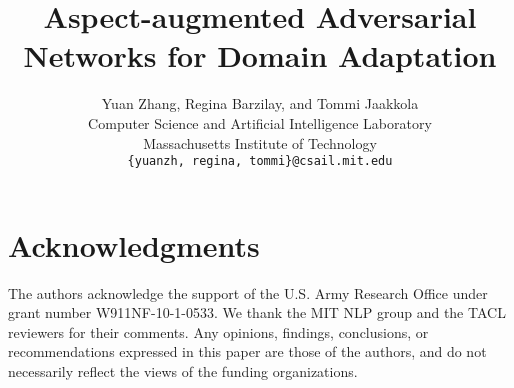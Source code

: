 \documentclass[11pt,letterpaper]{article}
\title{Aspect-augmented Adversarial Networks for Domain Adaptation}
\author{Yuan Zhang, Regina Barzilay, and Tommi Jaakkola\\
	    Computer Science and Artificial Intelligence Laboratory\\
	    Massachusetts Institute of Technology\\
	    {\tt \{yuanzh, regina, tommi\}@csail.mit.edu}
	  }
\date{}
\begin{document}
\maketitle
\begin{abstract}

\end{abstract}








\section*{Acknowledgments}
The authors acknowledge the support of the U.S. Army Research Office under grant number W911NF-10-1-0533. We thank the MIT NLP group and the TACL reviewers for their comments. Any opinions, findings, conclusions, or recommendations expressed in this paper are those of the authors, and do not necessarily reflect the views of the funding organizations.



\end{document}
